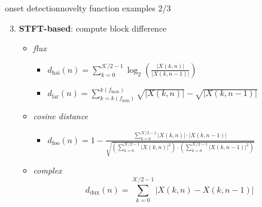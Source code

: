         \begin{frame}{onset detection}{novelty function examples 2/3}
            \begin{enumerate}   
                \setcounter{enumi}{2}
                \item	\textbf{STFT-based}: compute block difference 
                    \begin{itemize}
                        \item	\textit{flux}
                        {
                            \begin{itemize}
                                \item $d_\mathrm{hai}(n) = \sum\limits_{k = 0}^{\mathcal{K}/2-1}{\log_2\left(\frac{|X(k,n)|}{|X(k,n-1)|}\right)}$
                                \item $d_\mathrm{lar}(n) = \sum\limits_{k = k(f_{\mathrm{min}})}^{k(f_{\mathrm{max}})}{\sqrt{|X(k,n)|}-\sqrt{|X(k,n-1)|}}$
                            \end{itemize}
                        }
                        \item<2->	\textit{cosine distance}
                        {
                           \begin{itemize}
                                \item $d_\mathrm{foo}(n)	= 1 - \frac{\sum\limits_{k = 0}^{\mathcal{K}/2-1}{|X(k,n)|\cdot |X(k,n-1)|}}{\sqrt{\left(\sum\limits_{k=0}^{\mathcal{K}/2-1}{|X(k,n)|^2}\right)\cdot \left(\sum\limits_{k=0}^{\mathcal{K}/2-1}{|X(k,n-1)|^2}\right)}}$
                            \end{itemize}
                        }
                        \item<3->	\textit{complex}
                        {
                            \begin{equation*}
                                d_\mathrm{dux}(n) = \sum\limits_{k = 0}^{\mathcal{K}/2-1}{|X(k,n)-X(k,n-1)|}
                            \end{equation*}
                        }
                    \end{itemize}
            \end{enumerate}
        \end{frame}
